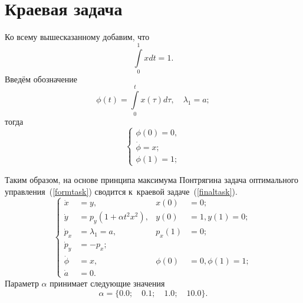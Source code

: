 \section{Краевая задача}
Ко всему вышесказанному добавим, что 
\[
\int\limits_{0}^{1} x dt = 1.
\]
Введём обозначение
\[
\phi(t) = \int\limits_{0}^{t} x(\tau) d\tau, \quad \lambda_1 = a;
\]
тогда 
\begin{equation}\label{dopeqq}
\begin{cases}
\phi(0) = 0,\\ 
\dot\phi = x;\\
\phi(1) = 1;
\end{cases}
\end{equation}

Таким образом, на основе принципа максимума Понтрягина задача оптимального управления~(\ref{formtask}) сводится к~краевой задаче~(\ref{finaltask}). 
\begin{equation}\label{finaltask}\left\{
\begin{aligned}
	\dot{x} &= y,&x(0)&=0; \\
	\dot{y} &= p_y (1 + \alpha t^2x^2),&y(0)&=1,y(1)=0;\\ %
	\dot{p}_x &= \lambda_1 = a,&p_x(1)&=0; \\
	\dot{p}_y &= - p_x;\\
	\dot\phi &= x,&\phi(0)&=0,\phi(1)=1;\\
	\dot{a} &= 0.
\end{aligned}\right.
\end{equation}
Параметр $\alpha$ принимает следующие значения
\[ \alpha = \{0.0;\quad 0.1; \quad 1.0; \quad 10.0\}.\]

